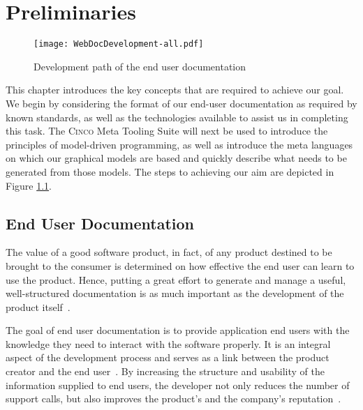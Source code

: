 
\chapter{Preliminaries}\label{ch:Basis}

\begin{figure}[t]
    \centering
    \texttt{[image: WebDocDevelopment-all.pdf]}
    \caption{Development path of the end user documentation}
    \label{fig:procWorkflow}
\end{figure}

This chapter introduces the key concepts that are required to achieve our goal. We begin by considering the format of our end-user documentation as required by known standards, as well as the technologies available to assist us in completing this task. The \textsc{Cinco} Meta Tooling Suite will next be used to introduce the principles of model-driven programming, as well as introduce the meta languages on which our graphical models are based and quickly describe what needs to be generated from those models. The steps to achieving our aim are depicted in Figure \ref{fig:procWorkflow}.

\pagebreak

\section{End User Documentation}\label{sec:endUserDoc}

The value of a good software product, in fact, of any product destined to be brought to the consumer is determined on how effective the end user can learn to use the product. Hence, putting a great effort to generate and manage a useful, well-structured documentation is as much important as the development of the product itself~\cite{ISO-IEC-IEEE}. 

The goal of end user documentation is to provide application end users with the knowledge they need to interact with the software properly. It is an integral aspect of the development process and serves as a link between the product creator and the end user~\cite{9238529}. By increasing the structure and usability of the information supplied to end users, the developer not only reduces the number of support calls, but also improves the product's and the company's reputation~\cite{ieee5712775}.

